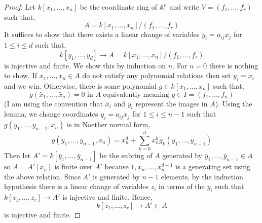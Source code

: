 \documentclass[12pt]{article}
\newcommand{\A}{\mathbb{A}}
\begin{document}
\begin{proof}
Let $k[x_1, \dots, x_n]$ be the coordinate ring of $\A^n$ and write $V = (f_1, \dots, f_r)$ such that,
\[ A = k[x_1, \dots, x_n]/(f_1, \dots, f_r) \]
It suffices to show that there exists a linear change of variables $y_i = a_{ij} x_j$ for $1 \le i \le d$ such that,
\[ k[y_1, \dots, y_d] \to A = k[x_1, \dots, x_n]/(f_1, \dots, f_r) \]
is injective and finite. We show this by induction on $n$. For $n = 0$ there is nothing to show. If $x_1, \dots, x_n \in A$ do not satisfy any polynomial relations then set $y_i = x_i$ and we win. Otherwise, there is some polynomial $g \in k[x_1, \dots, x_n]$ such that,
\[ g(\bar{x}_1, \dots, \bar{x}_n) = 0 \text{ in } A \text{ equivalently meaning } g \in I = (f_1, \dots, f_n) \]
(I am using the convention that $\bar{x}_i$ and $\bar{y}_i$ represent the images in $A$).
Using the lemma, we change coordinates $y_i = a_{ij} x_j$ for $1 \le i \le n-1$ such that $g(y_1, \dots, y_{n-1}, x_n)$ is in Noether normal form,
\[ g(y_1, \dots, y_{n-1}, x_n) = x_n^d + \sum_{k = 0}^d x_n^k g_k(y_1, \dots, y_{n-1}) \]
Then let $A' = k[\bar{y}_1, \dots, \bar{y}_{n-1}]$ be the subring of $A$ generated by $\bar{y}_1, \dots, \bar{y}_{n-1} \in A$ so $A = A'[x_n]$ is finite over $A'$ because $1, x_n, \dots, x_n^{d-1}$ is a generating set using the above relation. Since $A'$ is generated by $n-1$ elements, by the induction hypothesis there is a linear change of variables $z_i$ in terms of the $y_i$ such that $k[z_1, \dots, z_r] \to A'$ is injective and finite. Hence,
\[ k[z_1, \dots, z_r] \to A' \subset A \]
is injective and finite. 
\end{proof}
\end{document}
